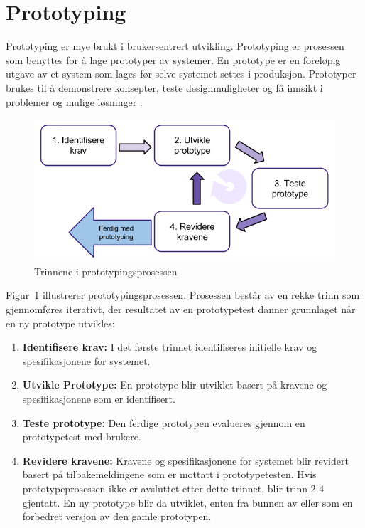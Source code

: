 \section{Prototyping} \label{sec:prototyping}
Prototyping er mye brukt i brukersentrert utvikling. Prototyping er prosessen som benyttes for å lage prototyper av systemer. En prototype er en foreløpig utgave av et system som lages før selve systemet settes i produksjon. Prototyper brukes til å demonstrere konsepter, teste designmuligheter og få innsikt i problemer og mulige løsninger \citep{suBoken}.

\begin{figure}[H]
    \centering
    \includegraphics[width=1\textwidth]{fig/bakgrunn/prototype.png}
    \caption{Trinnene i prototypingsprosessen}
    \label{fig:prototype}
\end{figure}

Figur~\ref{fig:prototype} illustrerer prototypingsprosessen. Prosessen består av en rekke trinn som gjennomføres iterativt, der resultatet av en prototypetest danner grunnlaget når en ny prototype utvikles:
\begin{enumerate}
\item \textbf{Identifisere krav:} I det første trinnet identifiseres initielle krav og spesifikasjonene for systemet.
\item \textbf{Utvikle Prototype:} En prototype blir utviklet basert på kravene og spesifikasjonene som er identifisert.
\item \textbf{Teste prototype:} Den ferdige prototypen evalueres gjennom en prototypetest med brukere.
\item \textbf{Revidere kravene:} Kravene og spesifikasjonene for systemet blir revidert basert på tilbakemeldingene som er mottatt i prototypetesten. Hvis prototypeprosessen ikke er avsluttet etter dette trinnet, blir trinn 2-4 gjentatt. En ny prototype blir da utviklet, enten fra bunnen av eller som en forbedret versjon av den gamle prototypen.
\end{enumerate}

